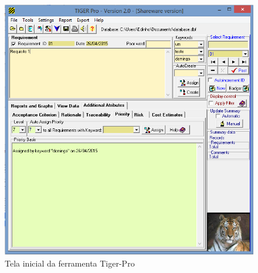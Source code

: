 \begin{figure}[!htb]
\centering
\includegraphics[scale=0.4]{figuras/tiger-pro.png}
\caption{Tela inicial da ferramenta Tiger-Pro}
\end{figure}

